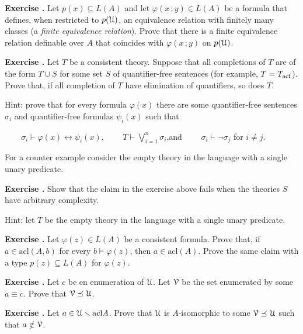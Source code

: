 \documentclass[10pt]{article}
\def\phi{\varphi}
\def\U{\EuScript U}
\def\V{\EuScript V}
\def\sm{\smallsetminus}
\def\acl{\textrm{acl}}
\newcounter{ex}
\newenvironment{exercise}{\bigskip\addtocounter{ex}{1}\textbf{Exercise \theex.\quad}}{}
\begin{document}
\begin{exercise}
Let $p(x)\subseteq L(A)$ and let $\phi(x\,;y)\in L(A)$ be a formula that defines, when restricted to $p(\U)$, an equivalence relation with finitely many classes (a \textit{finite equivalence relation\/}). Prove that there is a finite equivalence relation definable over $A$ that coincides with $\phi(x\,;y)$ on $p(\U)$.
\end{exercise}



\begin{exercise}
Let $T$ be a consistent theory. Suppose that all completions of $T$ are of the form 
$T\cup S$ for some set $S$ of quantifier-free sentences (for example, $T=T_{\rm acf}$). Prove that, if all completion of $T$ have elimination of quantifiers, so does $T$.

Hint: prove that for every formula $\phi(x)$ there are some quantifier-free sentences $\sigma_i$ and quantifier-free formulas $\psi_i(x)$ such that

$\displaystyle\qquad\sigma_i\vdash\phi(x)\leftrightarrow\psi_i(x)$, 
$\qquad\displaystyle T\vdash\bigvee^n_{i=1}\sigma_i$,\qquad and  $\qquad\sigma_i\vdash\neg\sigma_j$ for $i\neq j$.

For a counter example consider the empty theory in the language with a single unary predicate.
\end{exercise}



\begin{exercise}
Show that the claim in the exercise above fails when the theories $S$ have arbitrary complexity. 

Hint: let $T$ be the empty theory in the language with a single unary predicate.
\end{exercise}

\begin{exercise}
Let $\phi(z)\in L(A)$ be a consistent formula. Prove that, if $a\in\acl(A,b)$ for every $b\models\phi(z)$, then $a\in\acl(A)$. Prove the same claim with a type $p(z)\subseteq L(A)$ for $\phi(z)$.
\end{exercise}

\begin{exercise}
Let $c$ be en enumeration of $\U$. Let $\V$ be the set enumerated by some $a\equiv c$. Prove that $\V\preceq\U$.
\end{exercise}


\begin{exercise}
Let $a\in\U\sm\acl A$. Prove that $\U$ is $A$-isomorphic to some $\V\preceq \U$ such that $a\notin\V$.
\end{exercise}
\end{document}

